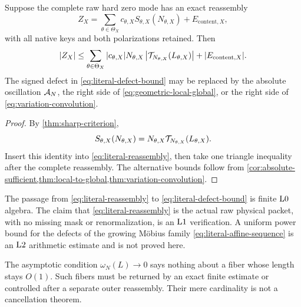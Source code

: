 \begin{theorem}
\label{thm:literal-certificate}
Suppose the complete raw hard zero mode has an exact reassembly
\begin{equation}
 Z_X=
 \sum_{\theta\in\Theta_X}
 c_{\theta,X}
 S_{\theta,X}(N_{\theta,X})
 +E_{\mathrm{content},X},
\label{eq:literal-reassembly}
\end{equation}
with all native keys and both polarizations retained.  Then
\begin{equation}
 |Z_X|
 \le
 \sum_{\theta\in\Theta_X}
 |c_{\theta,X}|N_{\theta,X}
 \left|
 \mathcal T_{N_{\theta,X}}(L_{\theta,X})
 \right|
 +|E_{\mathrm{content},X}|.
\label{eq:literal-defect-bound}
\end{equation}
The signed defect in \eqref{eq:literal-defect-bound} may be replaced
by the absolute oscillation \(\mathcal A_N\), the right side of
\eqref{eq:geometric-local-global}, or the right side of
\eqref{eq:variation-convolution}.
\end{theorem}

\begin{proof}
By \cref{thm:sharp-criterion},
\[
 S_{\theta,X}(N_{\theta,X})
 =
 N_{\theta,X}
 \mathcal T_{N_{\theta,X}}(L_{\theta,X}).
\]
Insert this identity into \eqref{eq:literal-reassembly}, then take
one triangle inequality after the complete reassembly.  The
alternative bounds follow from
\cref{cor:absolute-sufficient,thm:local-to-global,thm:variation-convolution}.
\end{proof}

\begin{remark}
\label{rem:exact-conditional}
The passage from \eqref{eq:literal-reassembly} to
\eqref{eq:literal-defect-bound} is finite \(\mathrm{L0}\) algebra.  The
claim that \eqref{eq:literal-reassembly} is the actual raw physical
packet, with no missing mask or renormalization, is an \(\mathrm{L1}\)
verification.  A uniform power bound for the defects of the growing
M\"obius family \eqref{eq:literal-affine-sequence} is an \(\mathrm{L2}\)
arithmetic estimate and is not proved here.
\end{remark}

\begin{remark}
\label{rem:short-fibers}
The asymptotic condition \(\omega_N(L)\to0\) says nothing about a
fiber whose length stays \(O(1)\).  Such fibers must be returned by
an exact finite estimate or controlled after a separate outer
reassembly.  Their mere cardinality is not a cancellation theorem.
\end{remark}

